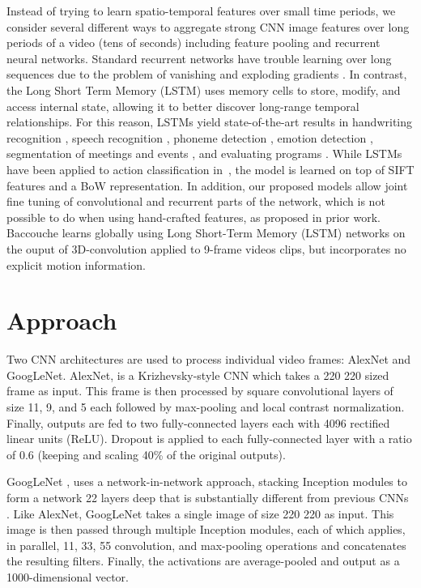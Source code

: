 \documentclass[10pt,twocolumn,letterpaper]{article}
\begin{document}
Instead of trying to learn spatio-temporal features over small time
periods, we consider several different ways to aggregate strong CNN
image features over long periods of a video (tens of seconds)
including feature pooling and recurrent neural networks. Standard
recurrent networks have trouble learning over long sequences due to
the problem of vanishing and exploding gradients
\cite{bengio94learning}.
In contrast, the Long Short Term Memory
(LSTM) \cite{hochreiter97long} uses memory cells to store, modify, and
access internal state, allowing it to better discover long-range
temporal relationships. For this reason, LSTMs yield state-of-the-art
results in handwriting recognition \cite{graves09novel,
  graves08offline}, speech recognition \cite{graves13speech,
  graves14towards}, phoneme detection \cite{fernandez08phoneme},
emotion detection \cite{wollmer13lstm}, segmentation of meetings and
events \cite{reiter06combined}, and evaluating programs
\cite{zaremba14learning}. While LSTMs have been applied to action
classification in~\cite{Baccouche2010}, the model is learned on top of
SIFT features and a BoW representation. In addition, our proposed
models allow joint fine tuning of convolutional and recurrent parts of
the network, which is not possible to do when using hand-crafted
features, as proposed in prior work. Baccouche \etal
\cite{Baccouche2010} learns globally using Long Short-Term Memory
(LSTM) networks on the ouput of 3D-convolution applied to 9-frame
videos clips, but incorporates no explicit motion information.
 
\section{Approach}
\vspace{-1em}
\label{sec:approach}

\label{subsec:cnns}
Two CNN architectures are used to process individual video frames:
AlexNet and GoogLeNet. AlexNet, is a Krizhevsky-style CNN
\cite{krizhevsky2012imagenet} which takes a 220  220 sized
frame as input. This frame is then processed by square convolutional layers
of size 11, 9, and 5 each followed by max-pooling and local
contrast normalization. Finally, outputs are fed to two fully-connected layers
each with 4096 rectified linear units (ReLU).
 Dropout is applied to each fully-connected layer with a ratio of
 0.6 (keeping and scaling 40\% of the original outputs).


GoogLeNet \cite{szegedy14going}, uses a network-in-network approach,
stacking Inception modules to form a network 22 layers deep that is
substantially different from previous CNNs
\cite{krizhevsky2012imagenet, zeiler13visualizing}. Like AlexNet,
GoogLeNet takes a single image of size 220  220 as input. This
image is then passed through multiple Inception modules, each of which
applies, in parallel, 11, 33, 55 convolution,
and max-pooling operations and concatenates the resulting
filters. Finally, the activations are average-pooled and output as a
1000-dimensional vector.
\end{document}

